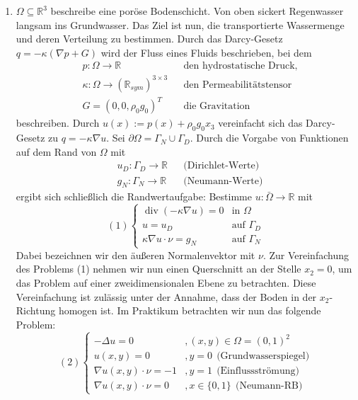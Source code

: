 \documentclass[12pt,a4paper]{scrartcl}
\newcommand{\R}{\mathbb{R}}
\DeclareMathOperator{\dive}{div}
\numberwithin{equation}{section}
\begin{document}
\begin{enumerate}[label=(\roman*)]
\item  $ \Omega \subseteq \R^3 $  beschreibe eine poröse Bodenschicht. Von oben sickert Regenwasser langsam ins Grundwasser. Das Ziel ist nun, die transportierte Wassermenge und deren Verteilung zu bestimmen.
\newline Durch das Darcy-Gesetz $ q= -\kappa(\nabla p + G)$ wird der Fluss eines Fluids beschrieben, bei dem 
\begin{align*}& p:\Omega \rightarrow \R &&\text{den hydrostatische Druck,}\\
&  \kappa : \Omega \rightarrow (\R_{sym})^{3\times3}  &&\text{den Permeabilitätstensor}\\
& G = (0,0,\rho_0 g_0)^T &&\text{die Gravitation}
\end{align*} beschreiben. Durch $u(x):=p(x)+\rho_0 g_0 x_3$ vereinfacht sich das Darcy-Gesetz zu $q=-\kappa\nabla u$.
\newline Sei $\partial \Omega = \Gamma_N \cup \Gamma_D$. Durch die Vorgabe von Funktionen auf dem Rand von $\Omega$ mit
\begin{align*}&u_D: \Gamma_D \rightarrow \R &&\text{(Dirichlet-Werte)}\\
& g_N: \Gamma_N \rightarrow \R &&\text{(Neumann-Werte)}
\end{align*} ergibt sich schließlich die Randwertaufgabe: Bestimme $u:\bar{\Omega} \rightarrow \R$ mit
\[(1)\begin{cases}
\dive (- \kappa \nabla u) = 0 &\text{in $\Omega$}\\
u = u_D  &\text{auf $\Gamma_D$}\\
\kappa \nabla u \cdot \nu = g_N &\text{auf $\Gamma_N$}   
\end{cases}
\]
Dabei bezeichnen wir den äußeren Normalenvektor mit $\nu$.
\newline Zur Vereinfachung des Problems (1) nehmen wir nun einen Querschnitt an der Stelle $x_2 = 0$, um das Problem auf einer zweidimensionalen Ebene zu betrachten. Diese Vereinfachung ist zulässig unter der Annahme, dass der Boden in der $x_2$-Richtung homogen ist. 
\newline Im Praktikum betrachten wir nun das folgende Problem:
\[(2)\begin{cases}
- \Delta u = 0 &,(x,y) \in \Omega = (0,1)^2\\
u(x,y) =0   &,y=0 \ \ \text{(Grundwasserspiegel)}\\
\nabla u(x,y) \cdot \nu = -1 &,y=1 \ \ \text{(Einflussströmung)}\\
\nabla u(x,y) \cdot \nu = 0 &,x\in \{0,1\}  \ \ \text{(Neumann-RB)}
\end{cases}
\]


\end{enumerate}
\end{document}
